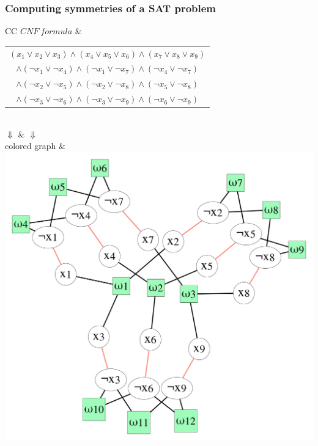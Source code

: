\documentclass{beamer}
\begin{document}
\begin{frame}
	\frametitle{Computing symmetries of a SAT problem}
	
	\begin{tabular}{CC}
		$CNF\ formula$ &{\scriptsize
			\begin{tabular}{c}
				$(x_1 \lor x_2 \lor x_3) \land
				(x_4 \lor x_5 \lor x_6) \land
				(x_7 \lor x_8 \lor x_9) $\\
				$\land (\neg x_1 \lor \neg x_4) \land
				(\neg x_1 \lor \neg x_7) \land
				(\neg x_4 \lor \neg x_7)$\\
				$\land (\neg x_2 \lor \neg x_5) \land
				(\neg x_2 \lor \neg x_8) \land
				(\neg x_5 \lor \neg x_8)$ \\
				$\land (\neg x_3 \lor \neg x_6) \land
				(\neg x_3 \lor \neg x_9) \land
				(\neg x_6 \lor \neg x_9)$\\
		\end{tabular}}\\
		\only<2> {
			$\Downarrow$ & $\Downarrow$  \\
			
			colored graph & 
			\includegraphics[scale=0.1]{images/graph}\\ \\
		}
		

\end{tabular}
\end{frame}
\end{document}
